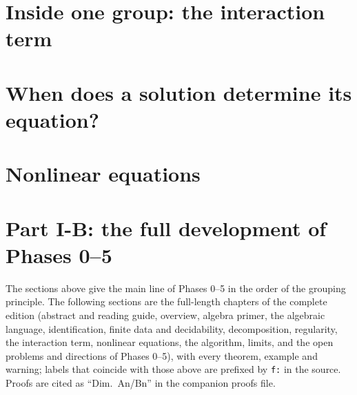 \section{Inside one group: the interaction term}\label{sec:inside}\label{ch:interaction}




\section{When does a solution determine its equation?}\label{sec:identify}\label{ch:ident}


\section{Nonlinear equations}\label{sec:nonlin}\label{ch:nonlin}


\section*{Part I-B: the full development of Phases 0--5}
\noindent The sections above give the main line of Phases 0--5 in the order of the grouping principle. The following sections are the full-length chapters of the complete edition (abstract and reading guide, overview, algebra primer, the algebraic language, identification, finite data and decidability,
decomposition, regularity, the interaction term, nonlinear equations, the algorithm, limits, and the open problems and directions of Phases 0--5), with every theorem, example and warning; labels that coincide with those above are prefixed by \texttt{f:} in the source. Proofs are cited as ``Dim.~An/Bn'' in the companion proofs file.














